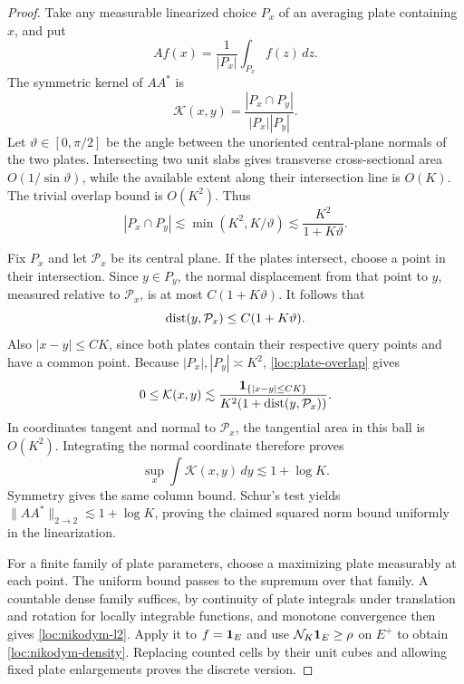 \begin{proof}
Take any measurable linearized choice $P_x$ of an averaging plate
containing $x$, and put
\[
 Af(x)=\frac1{|P_x|}\int_{P_x}f(z)\,dz.
\]
The symmetric kernel of $AA^*$ is
\[
 \mathcal K(x,y)=\frac{|P_x\cap P_y|}{|P_x||P_y|}.
\]
Let $\vartheta\in[0,\pi/2]$ be the angle between the unoriented
central-plane normals of the two plates.  Intersecting two unit
slabs gives transverse cross-sectional area $O(1/\sin\vartheta)$,
while the available extent along their intersection line is $O(K)$.
The trivial overlap bound is $O(K^2)$.  Thus
\begin{equation}
 |P_x\cap P_y|\lesssim
       \min(K^2,K/\vartheta)
       \lesssim\frac{K^2}{1+K\vartheta}.
 \label{loc:plate-overlap}
\end{equation}

Fix $P_x$ and let $\mathcal P_x$ be its central plane.  If the plates
intersect, choose a point in their intersection.  Since $y\in P_y$,
the normal displacement from that point to $y$, measured relative
to $\mathcal P_x$, is at most $C(1+K\vartheta)$.  It follows that
\[
 \operatorname{dist}(y,\mathcal P_x)\leq C(1+K\vartheta).
\]
Also $|x-y|\leq CK$, since both plates contain their respective
query points and have a common point.  Because $|P_x|,|P_y|\asymp K^2$,
\eqref{loc:plate-overlap} gives
\begin{equation}
 0\leq\mathcal K(x,y)
 \lesssim
 \frac{\mathbf 1_{\{|x-y|\leq CK\}}}
      {K^2(1+\operatorname{dist}(y,\mathcal P_x))}.
 \label{loc:schur-kernel}
\end{equation}
In coordinates tangent and normal to $\mathcal P_x$, the tangential
area in this ball is $O(K^2)$.  Integrating the normal coordinate
therefore proves
\[
 \sup_x\int\mathcal K(x,y)\,dy\lesssim1+\log K.
\]
Symmetry gives the same column bound.  Schur's test yields
$\|AA^*\|_{2\to2}\lesssim1+\log K$, proving the claimed squared
norm bound uniformly in the linearization.

For a finite family of plate parameters, choose a maximizing plate
measurably at each point.  The uniform bound passes to the supremum
over that family.  A countable dense family suffices, by continuity
of plate integrals under translation and rotation for locally
integrable functions, and monotone convergence then gives
\eqref{loc:nikodym-l2}.  Apply it to $f=\mathbf 1_E$ and use
$\mathcal N_K\mathbf 1_E\geq\rho$ on $E^+$ to obtain
\eqref{loc:nikodym-density}.  Replacing counted cells by their unit
cubes and allowing fixed plate enlargements proves the discrete
version.
\end{proof}

